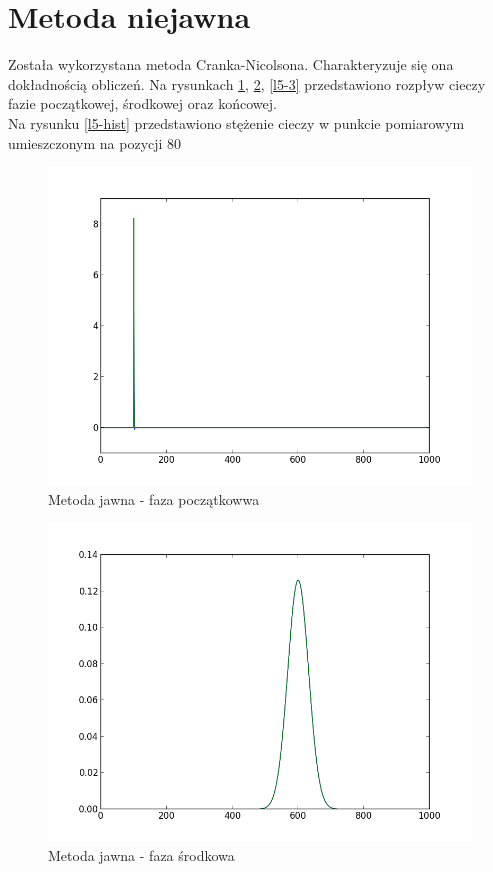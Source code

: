 \documentclass[a4paper,12pt]{article}
\begin{document}
	\section{Metoda niejawna}
	Została wykorzystana metoda Cranka-Nicolsona. Charakteryzuje się ona dokładnością obliczeń.
	Na rysunkach \ref{l5-1}, \ref{l5-2}, \ref{l5-3} przedstawiono rozpływ cieczy fazie początkowej, środkowej oraz końcowej.\\
	Na rysunku \ref{l5-hist} przedstawiono stężenie cieczy w punkcie pomiarowym umieszczonym na pozycji 80
	\begin{figure}
	\hspace{-100px}
	\includegraphics{plots2/00000}
	\caption{Metoda jawna - faza początkowwa}
	\label{l5-1}
	\end{figure}
	\begin{figure}
	\hspace{-100px}
	\includegraphics{plots2/00100}
	\caption{Metoda jawna - faza środkowa}
	\label{l5-2}
	\end{figure}
\end{document}
